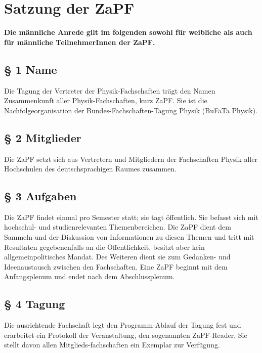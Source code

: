 



\chapter*{Satzung der ZaPF}

\textbf{Die männliche Anrede gilt im folgenden sowohl für weibliche
als auch für männliche TeilnehmerInnen der ZaPF.}

\section*{§ 1 Name}
Die Tagung der Vertreter der Physik-Fachschaften trägt den Namen Zusammenkunft
aller Physik-Fachschaften, kurz ZaPF.  Sie ist die Nachfolgeorganisation der
Bundes-Fachschaften-Tagung Physik (BuFaTa Physik).

\section*{§ 2 Mitglieder}
Die ZaPF setzt sich aus Vertretern und Mitgliedern der Fachschaften Physik
aller Hochschulen des deutschsprachigen Raumes zusammen.

\section*{§ 3 Aufgaben}
Die ZaPF findet einmal pro Semester statt; sie tagt öffentlich. Sie befasst
sich mit hochschul- und studienrelevanten Themenbereichen.  Die ZaPF dient dem
Sammeln und der Diskussion von Informationen zu diesen Themen und tritt mit
Resultaten gegebenenfalls an die Öffentlichkeit, besitzt aber kein
allgemeinpolitisches Mandat. Des Weiteren dient sie zum Gedanken- und
Ideenaustausch zwischen den Fachschaften. Eine ZaPF beginnt mit dem
Anfangsplenum und endet nach dem Abschlussplenum.

\section*{§ 4 Tagung}
Die ausrichtende Fachschaft legt den Programm-Ablauf der Tagung fest und
erarbeitet ein Protokoll der Veranstaltung, den sogenannten ZaPF-Reader. Sie
stellt davon allen Mitglieds-fachschaften ein Exemplar zur Verfügung.

\newpage
